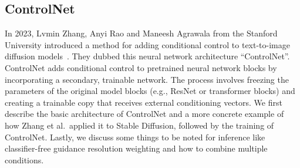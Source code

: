 \subsection{ControlNet}
In 2023, Lvmin Zhang, Anyi Rao and Maneesh Agrawala from the Stanford University introduced a method for adding conditional control to text-to-image diffusion models~\cite{zhang2023addingconditionalcontroltexttoimage}. They dubbed this neural network architecture ``ControlNet''. ControlNet adds conditional control to pretrained neural network blocks by incorporating a secondary, trainable network. The process involves freezing the parameters of the original model blocks (e.g., ResNet or transformer blocks) and creating a trainable copy that receives external conditioning vectors. We first describe the basic architecture of ControlNet and a more concrete example of how Zhang et al.\ applied it to Stable Diffusion, followed by the training of ControlNet. Lastly, we discuss some things to be noted for inference like classifier-free guidance resolution weighting and how to combine multiple conditions.

